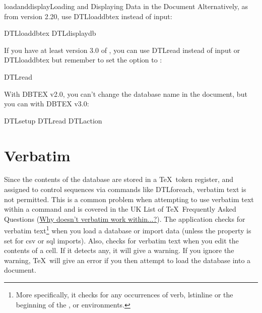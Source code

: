 \begin{example}{loadanddisplay}{Loading and Displaying Data in the
Document}
Alternatively, as from  version 2.20, use 
\gls{DTLloaddbtex} instead of \gls{input}:
\begin{codebox}
\codepar
\gls{DTLloaddbtex}
\codepar
{}
\gls{DTLdisplaydb}
\end{codebox}
If you have at least version 3.0 of , you can use
\gls{DTLread} instead of \gls{input} or \gls{DTLloaddbtex} but remember to set the
 option to :
\begin{codebox}
\gls{DTLread}
\end{codebox}
With DBTEX v2.0, you can't change the database name in the document,
but you can with DBTEX v3.0:
\begin{codebox}
\codepar
\gls{DTLsetup}
\gls{DTLread}
\codepar
{}
\gls{DTLaction}
\end{codebox}
\end{example}

\section{Verbatim}
\label{verbatim}

Since the contents of the database are stored in a \TeX\ token
register, and assigned to control sequences via commands like
\gls{DTLforeach}, verbatim text is not permitted. This is 
a common problem when attempting to use verbatim text within
a command and is covered in the UK List of \TeX\ Frequently
Asked Questions (\href{https://texfaq.org/FAQ-verbwithin}{Why doesn't verbatim work within...?}).
The  application checks for verbatim text\footnote{More
specifically, it checks for any occurrences of \gls{verb}, 
\gls{lstinline} or the beginning of the ,
 or  environments.} when you load a database or import
data (unless the  property is set for
\gls{csv} or \gls{sql} imports). Also,  checks for
verbatim text when you edit the contents of a cell. If it
detects any, it will give a warning. If you ignore the warning, 
\TeX\ will give an error if you then attempt to load the database into
a document.

